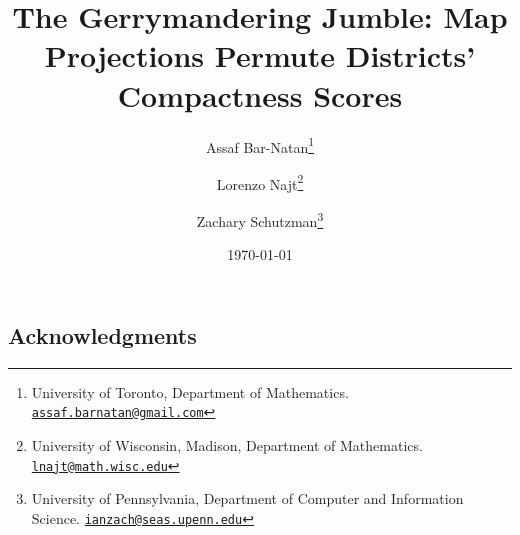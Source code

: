 \documentclass{article}
\title{The Gerrymandering Jumble: Map Projections Permute Districts' Compactness Scores}
\date{\today}
\author{Assaf Bar-Natan\thanks{University of Toronto, Department of Mathematics. \href{mailto:assaf.barnatan@gmail.com}{\texttt{assaf.barnatan@gmail.com}}} 
	\and Lorenzo Najt\thanks{University of Wisconsin, Madison, Department of Mathematics. \href{mailto:lnajt4@gmail.com}{\texttt{lnajt@math.wisc.edu}}}  
	\and Zachary Schutzman\thanks{University of Pennsylvania, Department of Computer and Information Science. \href{mailto:ianzach@seas.upenn.edu}{\texttt{ianzach@seas.upenn.edu}}}  }
\theoremstyle{definition}
\theoremstyle{remark}
\newcommand{\mute}[1]{}
\begin{document}
\maketitle
\begin{abstract}
\noindent
\end{abstract}
\ifarxiv
\else
\fi









%




%



\ifarxiv
\subsection*{Acknowledgments}


\else
\mute{
\begin{acknowledgment}{Acknowledgments}

\end{acknowledgment}
}
\fi





%
\end{document}
